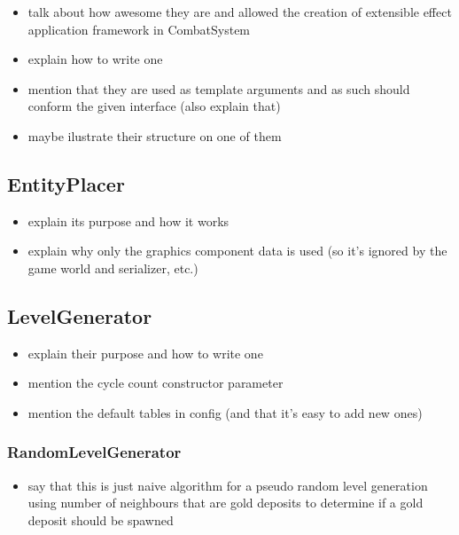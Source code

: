 \begin{itemize}
    \item talk about how awesome they are and allowed the creation of
        extensible effect application framework in CombatSystem
    \item explain how to write one
    \item mention that they are used as template arguments and as such
        should conform the given interface (also explain that)
    \item maybe ilustrate their structure on one of them
\end{itemize}

\subsection{EntityPlacer}

\begin{itemize}
    \item explain its purpose and how it works
    \item explain why only the graphics component data is used (so it's ignored
        by the game world and serializer, etc.)
\end{itemize}

\subsection{LevelGenerator}

\begin{itemize}
    \item explain their purpose and how to write one
    \item mention the cycle count constructor parameter
    \item mention the default tables in config (and that it's easy to add new ones)
\end{itemize}

\subsubsection{RandomLevelGenerator}

\begin{itemize}
    \item say that this is just naive algorithm for a pseudo random level generation
        using number of neighbours that are gold deposits to determine if a gold
        deposit should be spawned
\end{itemize}


